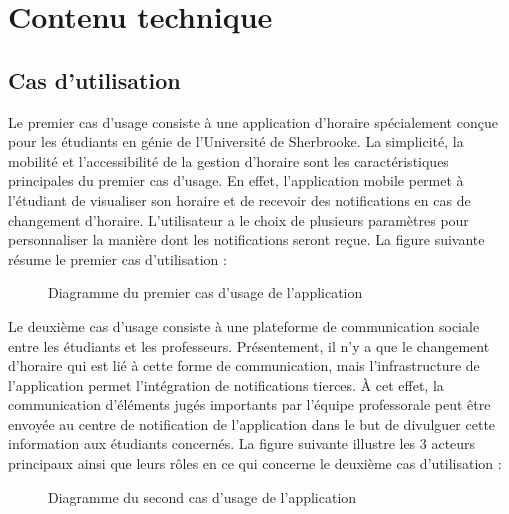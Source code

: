 \section{Contenu technique}
    \subsection{Cas d'utilisation}
    Le premier cas d'usage consiste à une application d'horaire spécialement conçue pour les étudiants en génie de l'Université de Sherbrooke. La simplicité, la mobilité et l'accessibilité de la gestion d'horaire sont les caractéristiques principales du premier cas d'usage. En effet, l'application mobile permet à l'étudiant de visualiser son horaire et de recevoir des notifications en cas de changement d'horaire. L'utilisateur a le choix de plusieurs paramètres pour personnaliser la manière dont les notifications seront reçue. La figure suivante résume le premier cas d'utilisation :
    
    \begin{figure}[p] \centering
        
        \caption{Diagramme du premier cas d'usage de l'application}
        \label{fig.casUsage1}
    \end{figure}

    Le deuxième cas d'usage consiste à une plateforme de communication sociale entre les étudiants et les professeurs. Présentement, il n'y a que le changement d'horaire qui est lié à cette forme de communication, mais l'infrastructure de l'application permet l'intégration de notifications tierces. À cet effet, la communication d'éléments jugés importants par l'équipe professorale peut être envoyée au centre de notification de l'application dans le but de divulguer cette information aux étudiants concernés. La figure suivante illustre les 3 acteurs principaux ainsi que leurs rôles en ce qui concerne le deuxième cas d'utilisation :

    \begin{figure}[p] \centering
        
        \caption{Diagramme du second cas d'usage de l'application}
        \label{fig.casUsage2}
    \end{figure}

